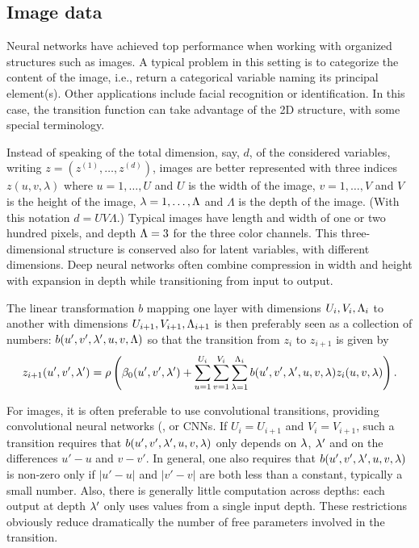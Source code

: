 \subsection{Image data}
 Neural networks have achieved top performance when working with organized structures such as images. 
 A typical problem in this setting is to categorize the content of the image, i.e., return a categorical variable naming its principal element(s).
 Other applications include facial recognition or identification.
 In this case, the transition function can take advantage of the 2D structure, with some special terminology.

Instead of speaking of the total dimension, say, $d$, of the considered variables, writing $z = (z^{(1)}, \ldots, z^{(d)})$, images are better represented with three indices $z(u, v, \lambda)$ where
 $u=1, \ldots, U$ and $U$ is the width of the image,  $v=1, \ldots, V$ and $V$ is the height of the image,  $\lambda=1, \ldots, \Lambda$ and $\Lambda$ is the depth of the image. (With this notation  $d =UV\Lambda$.)
  Typical images  have length and width of one or two hundred pixels, and depth $\Lambda=3$ for the three color channels.
 This three-dimensional structure is conserved also for latent variables, with different dimensions. 
 Deep neural networks   often combine compression in width and height with expansion in depth while transitioning  from input to output.


The linear transformation $b$ mapping one layer with dimensions $U_i, V_i, \Lambda_i$ to another with dimensions $U_{i+1}, V_{i+1}, \Lambda_{i+1}$ is then preferably seen as a collection of numbers: $b(u',v',\lambda', u,v, \Lambda)$ so that the transition from $z_i$ to $z_{i+1}$ is given by
\[
z_{i+1}(u', v', \lambda') = \rho\left(\beta_0(u', v', \lambda') 
+ \sum_{u=1}^{U_i}\sum_{v=1}^{V_i}\sum_{\lambda=1}^{\Lambda_i} b(u', v', \lambda', u,v,\lambda)  z_i(u,v,\lambda)\right).
\]

For images, it is often preferable to use convolutional transitions, providing convolutional neural networks (\citep{lecun1989backpropagation,lecun1995convolutional}, or CNNs.
 If $U_i=U_{i+1}$ and $V_i=V_{i+1}$, such a transition requires that  $b(u', v', \lambda', u,v,\lambda)$ only depends on $\lambda$, $\lambda'$ and on the differences $u'-u$ and $v-v'$.
In general, one also requires that  $b(u', v', \lambda', u,v,\lambda)$ is non-zero only if $|u'-u|$ and $|v'-v|$ are both less than a constant, typically a small number. Also, there is generally little computation across depths: each output at depth $\lambda'$ only uses values from a single input depth. These restrictions obviously reduce dramatically the number of free parameters involved in the transition.

